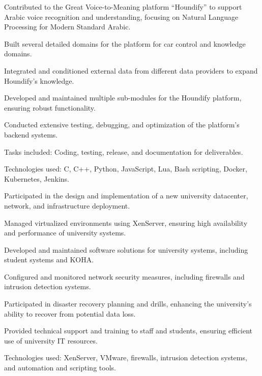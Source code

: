 \begin{resume_list}
    \item Contributed to the Great Voice-to-Meaning platform “Houndify” to support Arabic voice recognition and understanding, focusing on Natural Language Processing for Modern Standard Arabic.
    \item Built several detailed domains for the platform for car control and knowledge domains.
    \item Integrated and conditioned external data from different data providers to expand Houndify's knowledge.
    \item Developed and maintained multiple sub-modules for the Houndify platform, ensuring robust functionality.
    \item Conducted extensive testing, debugging, and optimization of the platform's backend systems.
    \item Tasks included: Coding, testing, release, and documentation for deliverables.
    \item Technologies used: C, C++, Python, JavaScript, Lua, Bash scripting, Docker, Kubernetes, Jenkins.
\end{resume_list}

\begin{resume_list}
    \item Participated in the design and implementation of a new university datacenter, network, and infrastructure deployment.
    \item Managed virtualized environments using XenServer, ensuring high availability and performance of university systems.
    \item Developed and maintained software solutions for university systems, including student systems and KOHA.
    \item Configured and monitored network security measures, including firewalls and intrusion detection systems.
    \item Participated in disaster recovery planning and drills, enhancing the university’s ability to recover from potential data loss.
    \item Provided technical support and training to staff and students, ensuring efficient use of university IT resources.
    \item Technologies used: XenServer, VMware, firewalls, intrusion detection systems, and automation and scripting tools.
\end{resume_list}
